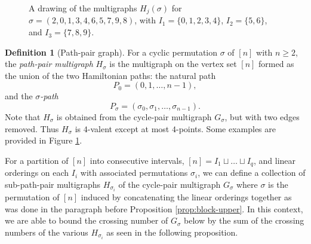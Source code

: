 \documentclass[11pt,a4paper]{amsart}
\theoremstyle{definition}
\newtheorem{definition}[theorem]{Definition}
\theoremstyle{remark}
\begin{document}
\begin{figure}[ht]
{%
}
\caption{A drawing of the multigraphs $H_j(\sigma)$ for
$\sigma=(2,0,1,3,4,6,5,7,9,8)$, with
$I_1=\{0,1,2,3,4\}$, $I_2=\{5,6\}$, and
$I_3=\{7,8,9\}$.}
\label{fig:scrambled}
\end{figure}

\begin{definition}[Path-pair graph]\label{def:ppmg}
For a cyclic permutation $\sigma$ of $[n]$ with $n \geq 2$, the \emph{path-pair multigraph} $H_{\sigma}$ is the multigraph on the vertex set $[n]$ formed as the union of the two Hamiltonian paths: the natural path 
\begin{equation*}
        P_0=(0,1,\ldots,n-1),
\end{equation*}
and the \emph{$\sigma$-path}
\begin{equation*}
        P_\sigma=(\sigma_0,\sigma_1,\ldots,\sigma_{n-1}).
\end{equation*}
Note that $H_{\sigma}$ is obtained from the cycle-pair multigraph $G_{\sigma}$, but with two edges removed.  Thus $H_{\sigma}$ is $4$-valent except at most $4$-points.  Some examples are provided in Figure \ref{fig:scrambled}.  
\end{definition}

For a partition of $[n]$ into consecutive intervals, $[n] = I_{1} \sqcup \hdots \sqcup I_{q}$, and linear orderings on each $I_{i}$ with associated permutations $\sigma_{i}$, we can define a collection of sub-path-pair multigraphs $H_{\sigma_{i}}$ of the cycle-pair multigraph $G_{\sigma}$ where $\sigma$ is the permutation of $[n]$ induced by concatenating the linear orderings together as was done in the paragraph before Proposition \ref{prop:block-upper}.  In this context, we are able to bound the crossing number of $G_{\sigma}$ below by the sum of the crossing numbers of the various $H_{\sigma_{i}}$ as seen in the following proposition.  
\end{document}
